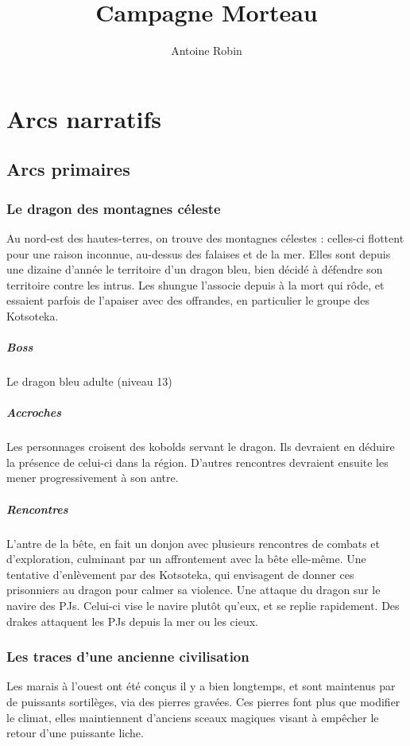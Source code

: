 \documentclass[10pt,a4paper]{book}
\author{ Antoine Robin}
\title{Campagne Morteau}
\begin{document}
\chapter{Arcs narratifs}
\section{Arcs primaires}
\subsection{Le dragon des montagnes céleste}
Au nord-est des hautes-terres, on trouve des montagnes célestes : celles-ci flottent pour une raison inconnue, au-dessus des falaises et de la mer. Elles sont depuis une dizaine d'année le territoire d'un dragon bleu, bien décidé à défendre son territoire contre les intrus. Les shungue l'associe depuis à la mort qui rôde, et essaient parfois de l'apaiser avec des offrandes, en particulier le groupe des Kotsoteka.
\paragraph{Boss} Le dragon bleu adulte (niveau 13)
\paragraph{Accroches} Les personnages croisent des kobolds servant le dragon. Ils devraient en déduire la présence de celui-ci dans la région. D'autres rencontres devraient ensuite les mener progressivement à son antre.
\paragraph{Rencontres}L'antre de la bête, en fait un donjon avec plusieurs rencontres de combats et d'exploration, culminant par un affrontement avec la bête elle-même. Une tentative d'enlèvement par des Kotsoteka, qui envisagent de donner ces prisonniers au dragon pour calmer sa violence. Une attaque du dragon sur le navire des PJs. Celui-ci vise le navire plutôt qu'eux, et se replie rapidement. Des drakes attaquent les PJs depuis la mer ou les cieux.
\subsection{Les traces d'une ancienne civilisation}
Les marais à l'ouest ont été conçus il y a bien longtemps, et sont maintenus par de puissants sortilèges, via des pierres gravées. Ces pierres font plus que modifier le climat, elles maintiennent d'anciens sceaux magiques visant à empêcher le retour d'une puissante liche.
\end{document}
